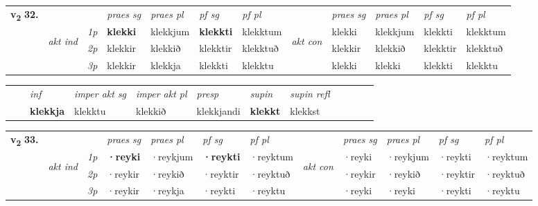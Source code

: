 \begin{tabular}{llllllllllll} \toprule
\multirow{4}{*}{{{\textbf{v{\textsubscript{2}}} \Large{\textbf{32.}}}}}  & &   &  \textit{praes sg}  & \textit{praes pl}  &\textit{ pf sg} & \textit{pf pl} &  &  \textit{praes sg}  & \textit{praes pl}  & \textit{pf sg} & \textit{pf pl } \\*
	\cmidrule{4-7} \cmidrule{9-12}
 & \multirow{3}{*}{\begin{turn}{90}\textit{akt ind}\end{turn}} & {\textit{1p}} & \textbf{klekki} & klekkjum    & \textbf{klekkti} & klekktum & \multirow{3}{*}{\begin{turn}{90}\textit{akt con}\end{turn}} &klekki & klekkjum & klekkti & klekktum\\*
& &  {\textit{2p}} &  klekkir  & klekkið   & klekktir & klekktuð & & klekkir & klekkið & klekktir & klekktuð \\*
& &  {\textit{3p}} & klekkir & klekkja   & klekkti & klekktu & & klekki & klekki& klekkti & klekktu  \\*
\cmidrule{4-7} \cmidrule{9-12}
\end{tabular}


\begin{tabular}{llllllllllll}
 & & \textit{inf} & \textit{imper akt sg} & \textit{imper akt pl}   & \textit{presp} & \textit{supin} & \textit{supin refl}      \\*
  & & \textbf{klekkja} & klekktu  & klekkið   & klekkjandi &  \textbf{klekkt} & klekkst  \\*
\cmidrule{1-12}
\end{tabular}



\begin{tabular}{llllllllllll} \toprule
\multirow{4}{*}{{{\textbf{v{\textsubscript{2}}} \Large{\textbf{33.}}}}}  & &   &  \textit{praes sg}  & \textit{praes pl}  &\textit{ pf sg} & \textit{pf pl} &  &  \textit{praes sg}  & \textit{praes pl}  & \textit{pf sg} & \textit{pf pl } \\*
	\cmidrule{4-7} \cmidrule{9-12}
 & \multirow{3}{*}{\begin{turn}{90}\textit{akt ind}\end{turn}} & {\textit{1p}} & \textbf{·reyki} & ·reykjum    & \textbf{·reykti} & ·reyktum & \multirow{3}{*}{\begin{turn}{90}\textit{akt con}\end{turn}} &·reyki & ·reykjum & ·reykti & ·reyktum\\*
& &  {\textit{2p}} &  ·reykir  & ·reykið   & ·reyktir & ·reyktuð & & ·reykir & ·reykið & ·reyktir & ·reyktuð \\*
& &  {\textit{3p}} & ·reykir & ·reykja   & ·reykti & ·reyktu & & ·reyki & ·reyki& ·reykti & ·reyktu  \\*
\cmidrule{4-7} \cmidrule{9-12}
\end{tabular}


